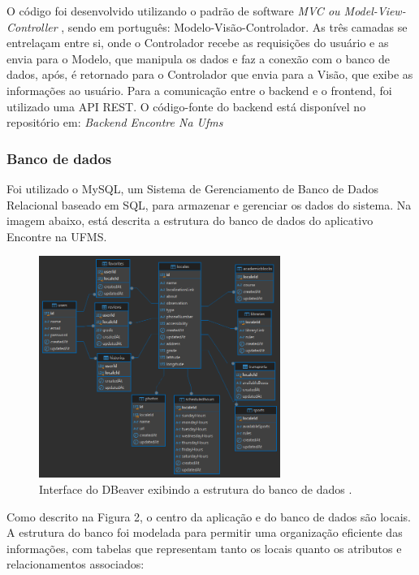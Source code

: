     O código foi desenvolvido utilizando o padrão de software \textit{MVC ou Model-View-Controller} \cite{mvc}, sendo em português: Modelo-Visão-Controlador. As três camadas se entrelaçam entre si, onde o Controlador recebe as requisições do usuário e as envia para o Modelo, que manipula os dados e faz a conexão com o banco de dados, após, é retornado para o Controlador que envia para a Visão, que exibe as informações ao usuário. Para a comunicação entre o backend e o frontend, foi utilizado uma API REST. O código-fonte do backend está disponível no repositório em: \textit{Backend Encontre Na Ufms} \cite{backend}

\subsubsection{Banco de dados}
    
    Foi utilizado o MySQL, um Sistema de Gerenciamento de Banco de Dados Relacional baseado em SQL, para armazenar e gerenciar os dados do sistema.  Na imagem abaixo, está descrita a estrutura do banco de dados do aplicativo Encontre na UFMS.

\begin{figure}[h]
    \centering
    \includegraphics[width=0.7\textwidth]{imagens/encontrenaufms.png}
    \caption{\scriptsize Interface do DBeaver exibindo a estrutura do banco de dados \cite{dbeaver}.}
    \footnotesize  {}
    \label{fig:descricaoBancoDeDados}
\end{figure}

    Como descrito na Figura 2, o centro da aplicação e do banco de dados são locais. A estrutura do banco foi modelada para permitir uma organização eficiente das informações, com tabelas que representam tanto os locais quanto os atributos e relacionamentos associados:

